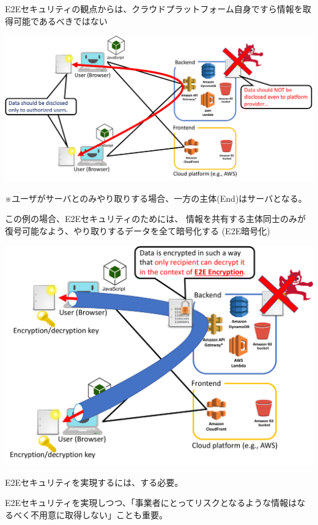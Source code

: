 \documentclass[12pt,dvipdfmx]{beamer}
\begin{document}
\begin{frame}
E2Eセキュリティの観点からは、\alert{クラウドプラットフォーム自身ですら情報を取得可能であるべきではない}
\begin{center}
\includegraphics[width=\linewidth]{Figs/e2e2.pdf}
\end{center}
{\footnotesize ※ユーザがサーバとのみやり取りする場合、一方の主体(End)はサーバとなる。}
\end{frame}

\begin{frame}
この例の場合、E2Eセキュリティのためには、
情報を共有する主体同士のみが復号可能なよう、やり取りするデータを全て暗号化する (\alert{E2E暗号化})
\begin{center}
\includegraphics[width=0.8\linewidth]{Figs/e2e3.pdf}
\end{center}
\end{frame}

\begin{frame}
\begin{alertblock}{}
E2Eセキュリティを実現するには、する必要。
\end{alertblock}

E2Eセキュリティを実現しつつ、「事業者にとってリスクとなるような情報はなるべく不用意に取得しない」ことも重要。
\end{frame}
\end{document}
